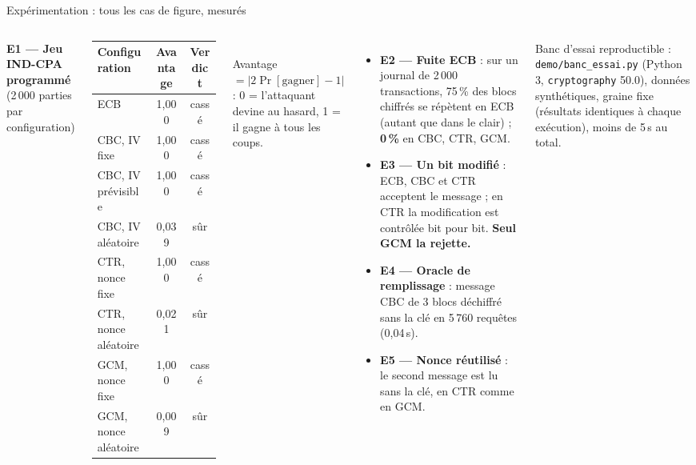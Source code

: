 \documentclass[aspectratio=169,10pt]{beamer}
\begin{document}
\begin{frame}{Expérimentation : tous les cas de figure, mesurés}
  \begin{columns}[T]
    \scriptsize\textbf{E1 --- Jeu IND-CPA programmé} (2\,000 parties par configuration)\\[0.2em]
    \begin{tabular}{lcc}
      \toprule
      Configuration & Avantage & Verdict \\
      \midrule
      ECB & 1,000 & \textcolor{espred}{cassé} \\
      CBC, IV fixe & 1,000 & \textcolor{espred}{cassé} \\
      CBC, IV prévisible & 1,000 & \textcolor{espred}{cassé} \\
      CBC, IV aléatoire & 0,039 & \textcolor{espgreen}{sûr} \\
      CTR, nonce fixe & 1,000 & \textcolor{espred}{cassé} \\
      CTR, nonce aléatoire & 0,021 & \textcolor{espgreen}{sûr} \\
      GCM, nonce fixe & 1,000 & \textcolor{espred}{cassé} \\
      GCM, nonce aléatoire & 0,009 & \textcolor{espgreen}{sûr} \\
      \bottomrule
    \end{tabular}\\[0.2em]
    \tiny Avantage $= |2\Pr[\text{gagner}] - 1|$ : 0 = l'attaquant devine au hasard, 1 = il gagne à tous les coups.
    \scriptsize
    \begin{itemize}
      \item \textbf{E2 --- Fuite ECB} : sur un journal de 2\,000 transactions, \alert{75\,\%} des blocs chiffrés
            se répètent en ECB (autant que dans le clair) ; \textbf{0\,\%} en CBC, CTR, GCM.
      \item \textbf{E3 --- Un bit modifié} : ECB, CBC et CTR acceptent le message ; en CTR la modification est
            \alert{contrôlée bit pour bit}. \textbf{Seul GCM la rejette.}
      \item \textbf{E4 --- Oracle de remplissage} \cite{vaudenay2002} : message CBC de 3 blocs
            \alert{déchiffré sans la clé} en 5\,760 requêtes (0,04\,s).
      \item \textbf{E5 --- Nonce réutilisé} : le second message est lu sans la clé, \alert{en CTR comme en GCM}.
    \end{itemize}
    \vspace{0.2em}
    \tiny Banc d'essai reproductible : \texttt{demo/banc\_essai.py} (Python 3, \texttt{cryptography} 50.0), données synthétiques, graine fixe (résultats identiques à chaque exécution), moins de 5\,s au total.
  \end{columns}
\end{frame}
\end{document}
